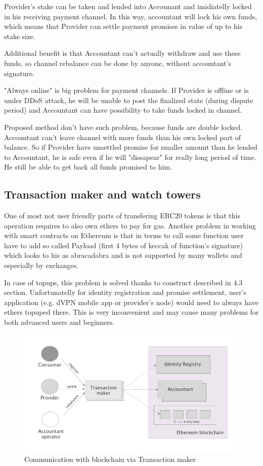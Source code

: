 \documentclass[a4paper,12pt]{article}
\begin{document}
Provider's stake can be taken and lended into Accounant and imidiatelly locked 
in his receiving payment channel. In this way, accountant will lock his own 
funds, which means that Provider can settle payment promises in value of up to 
his stake size.

Additional benefit is that Accountant can't actually withdraw and use these 
funds, so channel rebalance can be done by anyone, without accountant's 
signature.

"Always online" is big problem for payment channels. If Provider is offline or 
is under DDoS attack, he will be unable to post the finalized state (during 
dispute period) and Accountant can have possibility to take funds locked in 
channel.

Proposed method don't have such problem, because funds are double locked. 
Accountant can't leave channel with more funds than his own locked part of 
balance. So if Provider have unsettled promise for smaller amount than he 
lended to Accountant, he is safe even if he will "dissapear" for really long 
period of time. He still be able to get back all funds promised to him.

\subsection{Transaction maker and watch towers}

One of most not user friendly parts of transfering ERC20 tokens is that this
operation requires to also own ethers to pay for gas. Another problem in
working with smart contracts on Ethereum is that in terms to call some function
user have to add so called Payload (first 4 bytes of keccak of function's
signature) which looks to his as abracadabra and is not supported by many 
wallets and especially by exchanges. 

In case of topups, this problem is solved thanks to construct described in 4.3
section. Unfortunatelly for identity registration and promise settlement, user's 
application (e.g. dVPN mobile app or provider's node) would need to always have 
ethers topuped there. This is very inconvenient and may cause many problems for
both advanced users and beginners.

\begin{figure}[H]
    \centering
    \includegraphics[scale=0.5]{img/transactor}
    \caption{Communication with blockchain via Transaction maker}
    \label{img:transactor}
\end{figure}
\end{document}
